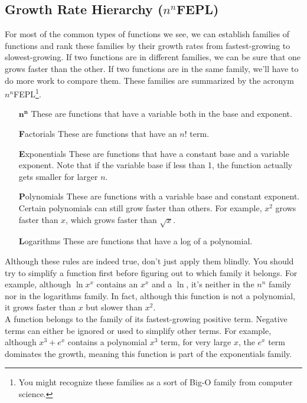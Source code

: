 \subsection{Growth Rate Hierarchy ($n^n$FEPL)}
For most of the common types of functions we see, we can establish families of functions and rank these families by their growth rates from fastest-growing to slowest-growing.
If two functions are in different families, we can be sure that one grows faster than the other.
If two functions are in the same family, we'll have to do more work to compare them.
These families are summarized by the acronym $n^n$FEPL\footnote{You might recognize these families as a sort of Big-O family from computer science.}.
\begin{itemize}[align=left, leftmargin=0.66in]
	\item[$\textbf{n}^\textbf{n}$] These are functions that have a variable both in the base and exponent.
	\item[\textbf{F}actorials] These are functions that have an $n!$ term.
	\item[\textbf{E}xponentials] These are functions that have a constant base and a variable exponent.
		Note that if the variable base if less than 1, the function actually gets smaller for larger $n$.
	\item[\textbf{P}olynomials] These are functions with a variable base and constant exponent.
		Certain polynomials can still grow faster than others.
		For example, $x^2$ grows faster than $x$, which grows faster than $\sqrt{x}$.
	\item[\textbf{L}ogarithms] These are functions that have a log of a polynomial.
\end{itemize}
\noindent
Although these rules are indeed true, don't just apply them blindly.
You should try to simplify a function first before figuring out to which family it belongs.
For example, although $\ln{x^x}$ contains an $x^x$ and a $\ln$, it's neither in the $n^n$ family nor in the logarithms family.
In fact, although this function is not a polynomial, it grows faster than $x$ but slower than $x^2$. \\

\noindent
A function belongs to the family of its fastest-growing positive term.
Negative terms can either be ignored or used to simplify other terms.
For example, although $x^3 + e^x$ contains a polynomial $x^3$ term, for very large $x$, the $e^x$ term dominates the growth, meaning this function is part of the exponentials family.
